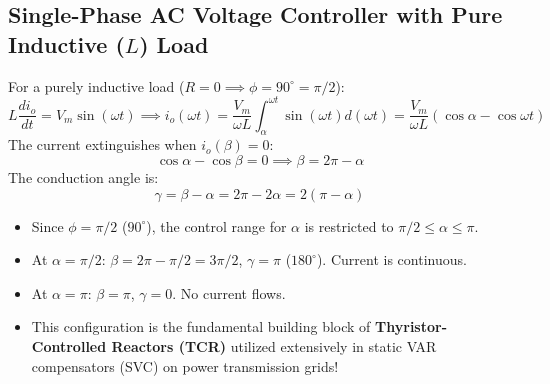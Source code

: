\documentclass[11pt,a4paper]{article}
\let\origsubsection\subsection
\renewcommand{\subsection}{\Needspace{7\baselineskip}\origsubsection}
\begin{document}
\subsection{Single-Phase AC Voltage Controller with Pure Inductive ($L$) Load}

For a purely inductive load ($R = 0 \implies \phi = 90^\circ = \pi/2$):
\begin{equation}
L \frac{di_o}{dt} = V_m \sin(\omega t) \implies i_o(\omega t) = \frac{V_m}{\omega L} \int_{\alpha}^{\omega t} \sin(\omega t) d(\omega t) = \frac{V_m}{\omega L} (\cos\alpha - \cos\omega t)
\end{equation}
The current extinguishes when $i_o(\beta) = 0$:
\begin{equation}
\cos\alpha - \cos\beta = 0 \implies \beta = 2\pi - \alpha
\end{equation}
The conduction angle is:
\begin{equation}
\gamma = \beta - \alpha = 2\pi - 2\alpha = 2(\pi - \alpha)
\end{equation}
\begin{itemize}[leftmargin=*]
  \item Since $\phi = \pi/2$ ($90^\circ$), the control range for $\alpha$ is restricted to $\pi/2 \le \alpha \le \pi$.
  \item At $\alpha = \pi/2$: $\beta = 2\pi - \pi/2 = 3\pi/2$, $\gamma = \pi$ ($180^\circ$). Current is continuous.
  \item At $\alpha = \pi$: $\beta = \pi$, $\gamma = 0$. No current flows.
  \item This configuration is the fundamental building block of \textbf{Thyristor-Controlled Reactors (TCR)} utilized extensively in static VAR compensators (SVC) on power transmission grids!
\end{itemize}
\end{document}
